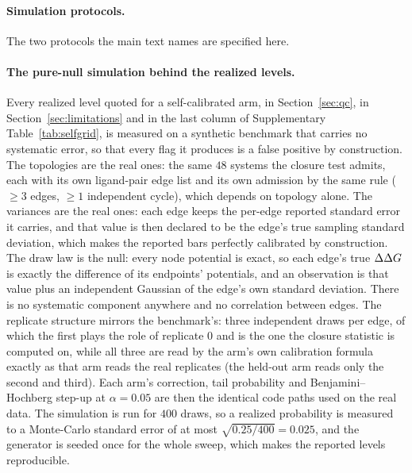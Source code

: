 \paragraph{Simulation protocols.} The two protocols the main text names are specified here.

\paragraph{The pure-null simulation behind the realized levels.} Every realized level quoted for a
self-calibrated arm, in Section~\ref{sec:qc}, in Section~\ref{sec:limitations} and in the last
column of Supplementary Table~\ref{tab:selfgrid}, is measured on a synthetic benchmark that carries
no systematic error, so that every flag it produces is a false positive by construction. The
topologies are the real ones: the same $48$ systems the closure test admits, each with its own
ligand-pair edge list and its own admission by the same rule ($\geq3$ edges, $\geq1$ independent
cycle), which depends on topology alone. The variances are the real ones: each edge keeps the
per-edge reported standard error it carries, and that value is then declared to be the
edge's true sampling standard deviation, which makes the reported bars perfectly calibrated by
construction. The draw law is the null: every node potential is exact, so each edge's true
$\Delta\Delta G$ is exactly the difference of its endpoints' potentials, and an observation is that value
plus an independent Gaussian of the edge's own standard deviation. There is no systematic
component anywhere and no correlation between edges. The replicate structure mirrors the
benchmark's: three independent draws per edge, of which the first plays the role of replicate $0$
and is the one the closure statistic is computed on, while all three are read by the arm's own
calibration formula exactly as that arm reads the real replicates (the held-out arm reads only the
second and third). Each arm's correction, tail probability and Benjamini--Hochberg step-up at
$\alpha=0.05$ are then the identical code paths used on the real data. The simulation is run for
$400$ draws, so a realized probability is measured to a Monte-Carlo standard error of at most
$\sqrt{0.25/400}=0.025$, and the generator is seeded once for the whole sweep, which makes the
reported levels reproducible.

